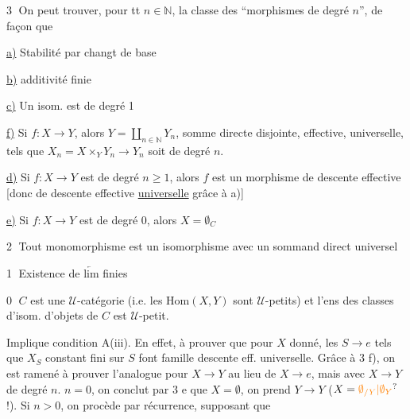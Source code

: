 

\textcircled{3} On peut trouver, pour tt $n\in\mathbb N$, la classe des ``morphismes de degré $n$'', de façon que

\uline{a)} Stabilité par changt de base

\uline{b)} additivité finie

\uline{c)} Un isom. est de degré 1

\uline{f)} Si $f:X\longrightarrow Y$, alors $Y=\coprod_{n\in\mathbb N}Y_n$, somme directe disjointe, effective, universelle, tels que $X_n=X\times_Y Y_n\longrightarrow Y_n$ soit de degré $n$.

\uline{d)} Si $f:X\longrightarrow Y$ est de degré $n\ge1$, alors $f$ est un morphisme de descente effective [donc de descente effective \uline{universelle} grâce à a)]

\uline{e)} Si $f:X\longrightarrow Y$ est de degré 0, alors $X=\emptyset_C$

\textcircled{2} Tout monomorphisme est un isomorphisme avec un sommand direct universel

\textcircled{1} Existence de $\underleftarrow{\mathrm{lim}}$ finies

 

\textcircled{0} $C$ est une $\mathcal U$-catégorie (i.e. les $\mathrm{Hom}(X,Y)$ sont $\mathcal U$-petits) et l'ens des classes d'isom. d'objets de $C$ est $\mathcal U$-petit.

 Implique condition A(iii). En effet, à prouver que pour $X$ donné, les $S\longrightarrow e$ tels que $X_S$ constant fini sur $S$ font famille  descente eff. universelle. Grâce à 3 f), on est ramené à prouver l'analogue pour $X\longrightarrow Y$ au lieu de $X\longrightarrow e$, mais avec $X\longrightarrow Y$ de degré $n$.   $n=0$, on conclut par 3 e que $X=\emptyset$, on prend $Y\longrightarrow Y$ ($X=\unsure{\emptyset_{/Y}|\emptyset_Y}$ !). Si $n>0$, on procède par récurrence, supposant que




